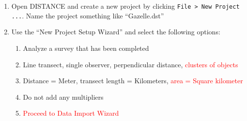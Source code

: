 \documentclass[12pt]{article}\usepackage[]{graphicx}\usepackage[]{color}
\begin{document}
\begin{enumerate}
\item Open DISTANCE and create a new project by clicking
  \verb+File > New Project ...+. Name the project something like
  ``Gazelle.dst''  
    
  \item Use the ``New Project Setup Wizard'' and select the
    following options: 
  \begin{enumerate}
    \item Analyze a survey that has been completed
    \item Line transect, single observer, perpendicular distance,
      \textcolor{red}{clusters of objects} 
    \item Distance = Meter, transect length = Kilometers,
      \textcolor{red}{area = Square kilometer}
    \item Do not add any multipliers
    \item \textcolor{red}{Proceed to Data Import Wizard}
  \end{enumerate}



\end{enumerate}
\end{document}
